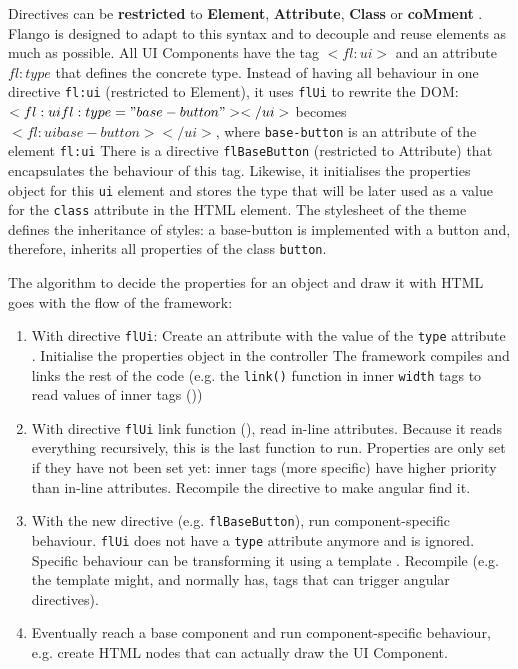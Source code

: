 Directives can be \textbf{restricted} to \textbf{Element}, \textbf{Attribute}, \textbf{Class} or \textbf{coMment} .
Flango \cm is designed to adapt to this syntax and to decouple and reuse elements as much as possible.
All UI Components have the tag $<fl:ui>$ and an attribute $fl:type$ that defines the concrete type.
Instead of having all behaviour in one directive \texttt{fl:ui} (restricted to Element), it uses \texttt{flUi} to rewrite the \ac{DOM}: $<fl:ui fl:type="base-button"></ui>$ becomes $<fl:ui base-button></ui>$, where \texttt{base-button} is an attribute of the element \texttt{fl:ui} 
There is a directive \texttt{flBaseButton} (restricted to Attribute) that encapsulates the behaviour of this tag.
Likewise, it initialises the properties object for this \texttt{ui} element and stores the type that will be later used as a value for the \texttt{class} attribute in the \ac{HTML} element.
The stylesheet of the theme defines the inheritance of styles: a base-button is implemented with a button and, therefore, inherits all properties of the class \texttt{button}.

The algorithm to decide the properties for an object and draw it with \ac{HTML} goes with the flow of the framework:
\begin{enumerate}
	\item With directive \texttt{flUi}: Create an attribute with the value of the \texttt{type} attribute . Initialise the properties object in the controller  The framework compiles and links the rest of the code (e.g. the \texttt{link()} function in inner \texttt{width} tags to read values of inner tags ())
	\item With directive \texttt{flUi} link function (), read in-line attributes. Because it reads everything recursively, this is the last function to run. Properties are only set if they have not been set yet: inner tags (more specific) have higher priority than in-line attributes. Recompile the directive to make angular find it. 
	\item With the new directive (e.g. \texttt{flBaseButton}), run component-specific behaviour. \texttt{flUi} does not have a \texttt{type} attribute anymore and is ignored. Specific behaviour can be transforming it using a template . Recompile (e.g. the template might, and normally has, tags that can trigger angular directives).
	\item Eventually reach a base component and run component-specific behaviour, e.g. create \ac{HTML} nodes that can actually draw the UI Component.
\end{enumerate}

